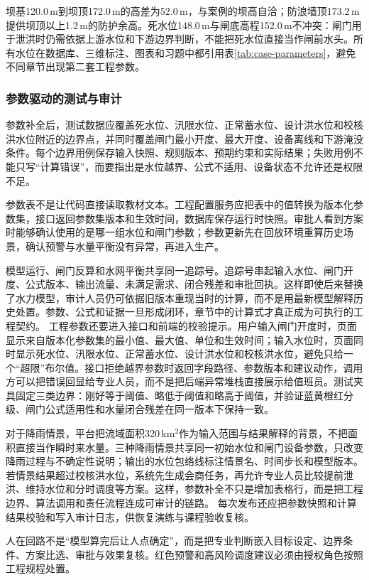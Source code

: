坝基120.0\,m到坝顶172.0\,m的高差为52.0\,m，与案例的坝高自洽；防浪墙顶173.2\,m提供坝顶以上1.2\,m的防护余高。死水位148.0\,m与闸底高程152.0\,m不冲突：闸门用于泄洪时仍需依据上游水位和下游边界判断，不能把死水位直接当作闸前水头。所有水位在数据库、三维标注、图表和习题中都引用表\ref{tab:case-parameters}，避免不同章节出现第二套工程参数。

\subsubsection{参数驱动的测试与审计}
参数补全后，测试数据应覆盖死水位、汛限水位、正常蓄水位、设计洪水位和校核洪水位附近的边界点，并同时覆盖闸门最小开度、最大开度、设备离线和下游淹没条件。每个边界用例保存输入快照、规则版本、预期约束和实际结果；失败用例不能只写“计算错误”，而要指出是水位越界、公式不适用、设备状态不允许还是权限不足。

参数表不是让代码直接读取教材文本。工程配置服务应把表中的值转换为版本化参数集，接口返回参数集版本和生效时间，数据库保存运行时快照。审批人看到方案时能够确认使用的是哪一组水位和闸门参数；参数更新先在回放环境重算历史场景，确认预警与水量平衡没有异常，再进入生产。

模型运行、闸门反算和水网平衡共享同一追踪号。追踪号串起输入水位、闸门开度、公式版本、输出流量、未满足需求、闭合残差和审批回执。这样即使后来替换了水力模型，审计人员仍可依据旧版本重现当时的计算，而不是用最新模型解释历史处置。参数、公式和证据一旦形成闭环，章节中的计算式才真正成为可执行的工程契约。
工程参数还要进入接口和前端的校验提示。用户输入闸门开度时，页面显示来自版本化参数集的最小值、最大值、单位和生效时间；输入水位时，页面同时显示死水位、汛限水位、正常蓄水位、设计洪水位和校核洪水位，避免只给一个“超限”布尔值。接口拒绝越界参数时返回字段路径、参数版本和建议动作，调用方可以把错误回显给专业人员，而不是把后端异常堆栈直接展示给值班员。测试夹具固定三类边界：刚好等于阈值、略低于阈值和略高于阈值，并验证蓝黄橙红分级、闸门公式适用性和水量闭合残差在同一版本下保持一致。

对于降雨情景，平台把流域面积320\,km$^2$作为输入范围与结果解释的背景，不把面积直接当作瞬时来水量。三种降雨情景共享同一初始水位和闸门设备参数，只改变降雨过程与不确定性说明；输出的水位包络线标注情景名、时间步长和模型版本。若情景结果超过校核洪水位，系统先生成会商任务，再允许专业人员比较提前泄洪、维持水位和分时调度等方案。这样，参数补全不只是增加表格行，而是把工程边界、算法调用和责任流程连成可审计的链路。 每次发布还应把参数快照和计算结果校验和写入审计日志，供恢复演练与课程验收复核。

人在回路不是“模型算完后让人点确定”，而是把专业判断嵌入目标设定、边界条件、方案比选、审批与效果复核。红色预警和高风险调度建议必须由授权角色按照工程规程处置。


